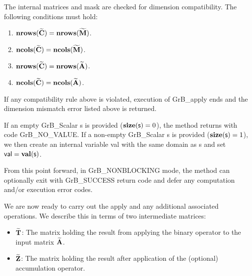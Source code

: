 The internal matrices and mask are checked for dimension compatibility. 
The following conditions must hold:
\begin{enumerate}
    \item $\bold{nrows}({\bf \widetilde{C}}) = \bold{nrows}({\bf \widetilde{M}})$.

    \item $\bold{ncols}({\bf \widetilde{C}}) = \bold{ncols}({\bf \widetilde{M}})$.

    \item $\bold{nrows}({\bf \widetilde{C}}) = \bold{nrows}({\bf \widetilde{A}})$.

    \item $\bold{ncols}({\bf \widetilde{C}}) = \bold{ncols}({\bf \widetilde{A}})$.
\end{enumerate}
If any compatibility rule above is violated, execution of {\sf GrB\_apply} ends and 
the dimension mismatch error listed above is returned.

{\color{red}
If an empty {\sf GrB\_Scalar} {\sf s} is provided ($\mathbf{size}({\sf s}) = 0$),
the method returns with code {\sf GrB\_NO\_VALUE}. If a non-empty {\sf GrB\_Scalar} {\sf s} is provided ($\mathbf{size}({\sf s}) = 1$),
we then create an internal variable {\sf val} with the same domain as {\sf s} and set ${\sf val} = \mathbf{val}({\sf s})$.
}

From this point forward, in {\sf GrB\_NONBLOCKING} mode, the method can optionally exit
with {\sf GrB\_SUCCESS} return code and defer any computation and/or execution error codes.

We are now ready to carry out the apply and any additional 
associated operations.  We describe this in terms of two intermediate matrices:
\begin{itemize}
    \item ${\bf \widetilde{T}}$: The matrix holding the result from applying the binary operator to the input matrix
    ${\bf \widetilde{A}}$.

    \item ${\bf \widetilde{Z}}$: The matrix holding the result after 
    application of the (optional) accumulation operator.
\end{itemize}


